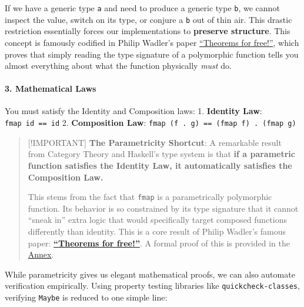 \documentclass[
]{article}
\newenvironment{Shaded}{}{}
\newcommand{\CommentTok}[1]{\textcolor[rgb]{0.38,0.63,0.69}{\textit{#1}}}
\newcommand{\DataTypeTok}[1]{\textcolor[rgb]{0.56,0.13,0.00}{#1}}
\newcommand{\KeywordTok}[1]{\textcolor[rgb]{0.00,0.44,0.13}{\textbf{#1}}}
\newcommand{\NormalTok}[1]{#1}
\newcommand{\OperatorTok}[1]{\textcolor[rgb]{0.40,0.40,0.40}{#1}}
\newcommand{\OtherTok}[1]{\textcolor[rgb]{0.00,0.44,0.13}{#1}}
\newcommand{\StringTok}[1]{\textcolor[rgb]{0.25,0.44,0.63}{#1}}
\begin{document}
If we have a generic type \texttt{a} and need to produce a generic type
\texttt{b}, we cannot inspect the value, switch on its type, or conjure
a \texttt{b} out of thin air. This drastic restriction essentially
forces our implementations to \textbf{preserve structure}. This concept
is famously codified in Philip Wadler's paper
\href{https://people.mpi-sws.org/~dreyer/tor/papers/wadler.pdf}{``Theorems
for free!''}, which proves that simply reading the type signature of a
polymorphic function tells you almost everything about what the function
physically \emph{must} do.

\paragraph{3. Mathematical Laws}\label{mathematical-laws}

You must satisfy the Identity and Composition laws: 1. \textbf{Identity
Law}: \texttt{fmap\ id\ ==\ id} 2. \textbf{Composition Law}:
\texttt{fmap\ (f\ .\ g)\ ==\ (fmap\ f)\ .\ (fmap\ g)}

\begin{quote}
{[}!IMPORTANT{]} \textbf{The Parametricity Shortcut}: A remarkable
result from Category Theory and Haskell's type system is that \textbf{if
a parametric function satisfies the Identity Law, it automatically
satisfies the Composition Law.}

This stems from the fact that \texttt{fmap} is a parametrically
polymorphic function. Its behavior is so constrained by its type
signature that it cannot ``sneak in'' extra logic that would
specifically target composed functions differently than identity. This
is a core result of Philip Wadler's famous paper:
\href{https://people.mpi-sws.org/~dreyer/tor/papers/wadler.pdf}{\textbf{``Theorems
for free!''}}. A formal proof of this is provided in the
\hyperref[proof-of-identity-implies-composition]{Annex}.
\end{quote}

While parametricity gives us elegant mathematical proofs, we can also
automate verification empirically. Using property testing libraries like
\texttt{quickcheck-classes}, verifying \texttt{Maybe} is reduced to one
simple line:

\begin{Shaded}
\end{Shaded}
\end{document}
